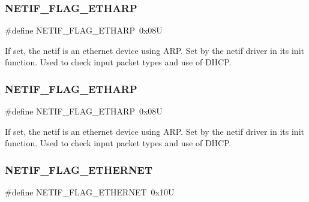 \subsubsection{\texorpdfstring{N\+E\+T\+I\+F\+\_\+\+F\+L\+A\+G\+\_\+\+E\+T\+H\+A\+RP}{NETIF\_FLAG\_ETHARP}\hspace{0.1cm}{\footnotesize\ttfamily [1/2]}}
{\footnotesize\ttfamily \#define N\+E\+T\+I\+F\+\_\+\+F\+L\+A\+G\+\_\+\+E\+T\+H\+A\+RP~0x08U}

If set, the netif is an ethernet device using A\+RP. Set by the netif driver in its init function. Used to check input packet types and use of D\+H\+CP. \mbox{\label{group__netif__flags_ga92448dc510bc8d700c09e5c971ef0676}} 
\subsubsection{\texorpdfstring{N\+E\+T\+I\+F\+\_\+\+F\+L\+A\+G\+\_\+\+E\+T\+H\+A\+RP}{NETIF\_FLAG\_ETHARP}\hspace{0.1cm}{\footnotesize\ttfamily [2/2]}}
{\footnotesize\ttfamily \#define N\+E\+T\+I\+F\+\_\+\+F\+L\+A\+G\+\_\+\+E\+T\+H\+A\+RP~0x08U}

If set, the netif is an ethernet device using A\+RP. Set by the netif driver in its init function. Used to check input packet types and use of D\+H\+CP. \mbox{\label{group__netif__flags_ga76ad9d0cf9f029df0ab2a998c64040dc}} 
\subsubsection{\texorpdfstring{N\+E\+T\+I\+F\+\_\+\+F\+L\+A\+G\+\_\+\+E\+T\+H\+E\+R\+N\+ET}{NETIF\_FLAG\_ETHERNET}\hspace{0.1cm}{\footnotesize\ttfamily [1/2]}}
{\footnotesize\ttfamily \#define N\+E\+T\+I\+F\+\_\+\+F\+L\+A\+G\+\_\+\+E\+T\+H\+E\+R\+N\+ET~0x10U}

